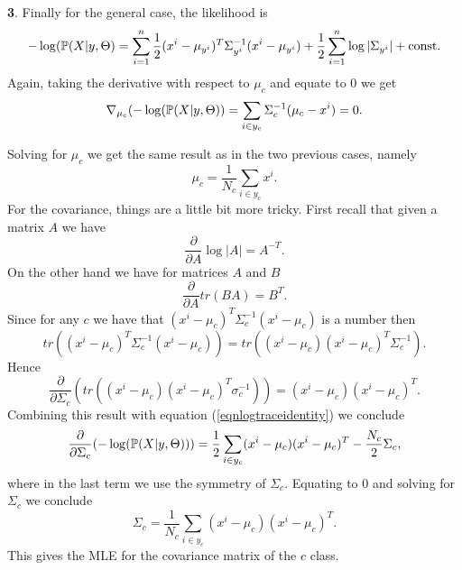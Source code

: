 \documentclass{article}
\begin{document}
\textbf{3}. Finally for the general case, the likelihood is 
\begin{equation*}
-\log(\mathbb{P}(X|y,\Theta) = \sum_{i=1}^n \frac{1}{2}(x^i - \mu_{y^i})^T\Sigma_{y^i}^{-1}(x^i - \mu_{y^i}) + \frac 1 2\sum_{i=1}^n \log|\Sigma_{y^i}| + \text{const.}
\end{equation*}
Again, taking the derivative with respect to $\mu_{c}$ and equate to $0$  we get
\begin{equation*}
\nabla_{\mu_{c}}(-\log(\mathbb{P}(X|y,\Theta))=\sum_{i\in y_{c}}\Sigma_{c}^{-1}(\mu_{c}-x^{i})=0.
\end{equation*}

Solving for $\mu_{c}$ we get the same result as in the two previous cases, namely 
\begin{equation*}
\mu_{c}=\frac{1}{N_{c}}\sum_{i\in y_{c}}x^{i}.
\end{equation*}
For the covariance, things are a little bit more tricky. First recall that given a matrix $A$ we have
\begin{equation}\label{eqnlogtraceidentity}
\frac{\partial}{\partial A}\log|A|=A^{-T}.
\end{equation}
On the other hand we have for matrices $A$ and $B$
\begin{equation*}
\frac{\partial}{\partial A}tr(BA)=B^{T}.
\end{equation*}
Since for any $c$ we have that $(x^{i}-\mu_{c})^{T}\Sigma_{c}^{-1}(x^{i}-\mu_{c})$ is a number then
\begin{equation*}
tr((x^{i}-\mu_{c})^{T}\Sigma_{c}^{-1}(x^{i}-\mu_{c}))=tr((x^{i}-\mu_{c})(x^{i}-\mu_{c})^{T}\Sigma_{c}^{-1}).
\end{equation*}
Hence
\begin{equation*}
\frac{\partial}{\partial\Sigma_{c}}(tr((x^{i}-\mu_{c})(x^{i}-\mu_{c})^{T}\sigma_{c}^{-1}))=(x^{i}-\mu_{c})(x^{i}-\mu_{c})^{T}.
\end{equation*}
Combining this result with equation (\ref{eqnlogtraceidentity}) we conclude
\begin{equation*}
\frac{\partial}{\partial\Sigma_{c}}(-\log(\mathbb{P}(X|y,\Theta)))=\frac{1}{2}\sum_{i\in y_{c}}(x^{i}-\mu_{c})(x^{i}-\mu_{c})^{T}-\frac{N_{c}}{2}\Sigma_{c},
\end{equation*}
where in the last term we use the symmetry of $\Sigma_{c}$. Equating to $0$ and solving for $\Sigma_{c}$ we conclude
\begin{equation*}
\Sigma_{c}=\frac{1}{N_{c}}\sum_{i\in y_{c}}(x^{i}-\mu_{c})(x^{i}-\mu_{c})^{T}.
\end{equation*}
This gives the MLE for the covariance matrix of the $c$ class.
\newline
\end{document}
